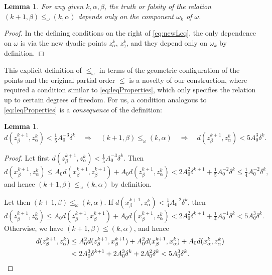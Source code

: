 \documentclass{amsart}
\numberwithin{equation}{section}
\theoremstyle{plain}
\newtheorem{lemma}[equation]{Lemma}
\theoremstyle{definition}
\theoremstyle{remark}
\begin{document}
{{\begin{lemma}
For any given $k,\alpha,\beta$, the truth or falsity of the relation $(k+1,\beta)\leq_{\omega}(k,\alpha)$ depends only on the component $\omega_k$ of $\omega$.
\end{lemma}

\begin{proof}
In the defining conditions on the right of \eqref{eq:newLeq}, the only dependence on $\omega$ is via the new dyadic points $z^k_\alpha$, $z^k_\gamma$, and they depend only on $\omega_k$ by definition.
\end{proof}

This explicit definition of $\leq_\omega$ in terms of  the geometric configuration of the points and the original partial order $\leq$ is a novelty of our construction, where \cite{HK,HM} required a condition similar to \eqref{eq:leqProperties}, which only specifies the relation up to certain degrees of freedom. For us, a condition analogous to \eqref{eq:leqProperties} is a \emph{consequence} of the definition:

\begin{lemma}\label{lem:newLeqVsDist}
\begin{equation*}
 d(z^{k+1}_{\beta},z^k_{\alpha})<\tfrac15 A_0^{-3}\delta^k\quad\Longrightarrow\quad(k+1,\beta)\leq_{\omega}(k,\alpha)
 \quad\Longrightarrow\quad d(z^{k+1}_{\beta},z^k_{\alpha})<5A_0^3\delta^k.
\end{equation*}
\end{lemma}

\begin{proof}
Let first $d(z^{k+1}_{\beta},z^k_{\alpha})<\tfrac15 A_0^{-3}\delta^k$. Then
\begin{equation*}
  d(x^{k+1}_{\beta},z^k_{\alpha})
  \leq A_0d(x^{k+1}_{\beta},z^{k+1}_{\beta})+A_0d(z^{k+1}_{\beta},z^k_{\alpha})
  <2A_0^2\delta^{k+1}+\tfrac15 A_0^{-2}\delta^k\leq\tfrac14A_0^{-2}\delta^k,
\end{equation*}
and hence $(k+1,\beta)\leq_{\omega}(k,\alpha)$ by definition.

Let then $(k+1,\beta)\leq_{\omega}(k,\alpha)$. If $d(x^{k+1}_{\beta},z^k_{\alpha})<\tfrac14 A_0^{-2}\delta^k$, then
\begin{equation*}
  d(z^{k+1}_{\beta},z^k_{\alpha})\leq A_0d(z^{k+1}_{\beta},x^{k+1}_{\beta})+A_0d(x^{k+1}_{\beta},z^k_{\alpha})
  <2A_0^2\delta^{k+1}+\tfrac14A_0^{-1}\delta^k<5A_0^3\delta^k.
\end{equation*}
Otherwise, we have $(k+1,\beta)\leq(k,\alpha)$, and hence
\begin{equation*}
\begin{split}
  d(z^{k+1}_{\beta},z^k_{\alpha})
  &\leq A_0^2d(z^{k+1}_{\beta},x^{k+1}_{\beta})+A_0^2d(x^{k+1}_{\beta},x^k_{\alpha})+A_0d(x^k_{\alpha},z^k_{\alpha}) \\
  &<2A_0^3\delta^{k+1}+2A_0^3\delta^k+2A_0^2\delta^k< 5A_0^3\delta^k.\qedhere
\end{split}
\end{equation*}
\end{proof}

}}
\end{document}
